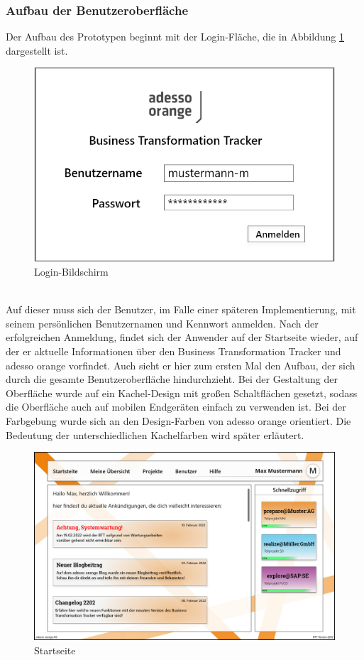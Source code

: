 \subsubsection{Aufbau der Benutzeroberfläche}
Der Aufbau des Prototypen beginnt mit der Login-Fläche, die in Abbildung \ref{fig:Login} dargestellt ist. 
\begin{figure}[h!]
    \centering
    \includegraphics[scale=0.35]{./Prototyp/01_Login.png}
    \caption[Prototyp: Login-Bildschirm]{Login-Bildschirm}
    \label{fig:Login}
\end{figure}
\\Auf dieser muss sich der Benutzer, im Falle einer späteren Implementierung, mit seinem persönlichen Benutzernamen und Kennwort anmelden. Nach der erfolgreichen Anmeldung, findet sich der Anwender auf der Startseite wieder, auf der er aktuelle Informationen über den Business Transformation Tracker und adesso orange vorfindet.
Auch sieht er hier zum ersten Mal den Aufbau, der sich durch die gesamte Benutzeroberfläche hindurchzieht. Bei der Gestaltung der Oberfläche wurde auf ein \glqq{}Kachel-Design\grqq{} mit großen Schaltflächen gesetzt, sodass die Oberfläche auch auf mobilen Endgeräten einfach zu verwenden ist. Bei der Farbgebung wurde sich an den Design-Farben von adesso orange orientiert. Die Bedeutung der unterschiedlichen Kachelfarben wird später erläutert. 
\begin{figure}[h!]
    \centering
    \includegraphics[scale=0.35]{./Prototyp/02_Startseite.png}
    \caption[Prototyp: Startseite]{Startseite}
    \label{fig:Startseite}
\end{figure}

